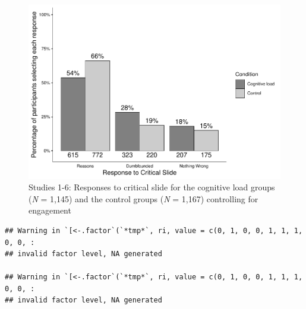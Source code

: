 \documentclass[
  american,
  man,floatsintext]{apa7}
\begin{document}
\begin{figure}
\centering
\includegraphics{Combined_analyses_files/figure-latex/ch5Sallfig2criticalcondition-1.pdf}
\caption{\label{fig:ch5Sallfig2criticalcondition}Studies 1-6: Responses to critical slide for the cognitive load groups (\emph{N} = 1,145) and the control groups (\emph{N} = 1,167) controlling for engagement}
\end{figure}

\begin{verbatim}
## Warning in `[<-.factor`(`*tmp*`, ri, value = c(0, 1, 0, 0, 1, 1, 1, 0, 0, :
## invalid factor level, NA generated

## Warning in `[<-.factor`(`*tmp*`, ri, value = c(0, 1, 0, 0, 1, 1, 1, 0, 0, :
## invalid factor level, NA generated
\end{verbatim}
\end{document}

